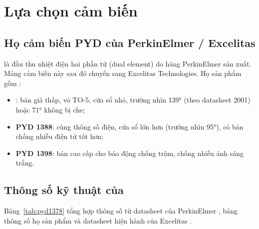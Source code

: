 \section{Lựa chọn cảm biến}
\label{sec:chonsensor}

\subsection{Họ cảm biến PYD của PerkinElmer / Excelitas}

\PYD{} là đầu thu nhiệt điện hai phần tử (dual element) do hãng PerkinElmer sản xuất. Mảng cảm biến này sau đó chuyển sang Excelitas Technologies. Họ sản phẩm gồm \cite{pyd1378-ds,pyd-family,pyd1378}:
\begin{itemize}
  \item \textbf{\PYD{}}: bản giá thấp, vỏ TO-5, cửa sổ nhỏ, trường nhìn 139° (theo datasheet 2001) hoặc 71° không bị che;
  \item \textbf{PYD 1388}: cùng thông số điện, cửa sổ lớn hơn (trường nhìn 95°), có bản chống nhiễu điện từ tốt hơn;
  \item \textbf{PYD 1398}: bản cao cấp cho báo động chống trộm, chống nhiễu ánh sáng trắng.
\end{itemize}

\subsection{Thông số kỹ thuật của \PYD{}}

Bảng~\ref{tab:pyd1378} tổng hợp thông số từ datasheet \PYD{} của PerkinElmer \cite{pyd1378-ds}, bảng thông số họ sản phẩm \cite{pyd-family} và datasheet hiện hành của Excelitas \cite{pyd1378}.

